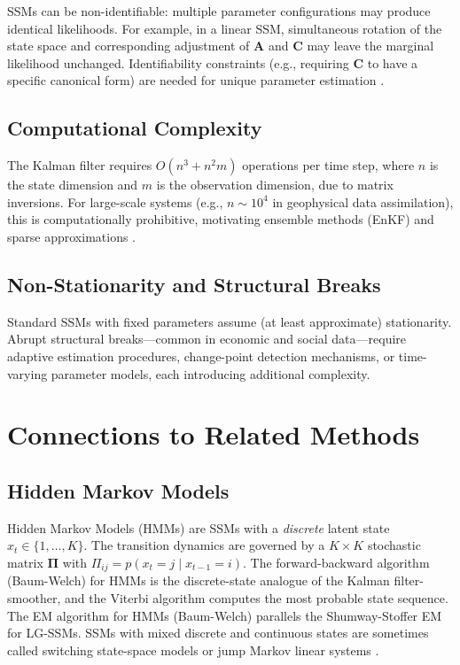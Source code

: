 \documentclass[conference]{IEEEtran}
\begin{document}
SSMs can be non-identifiable: multiple parameter configurations may produce identical likelihoods. For example, in a linear SSM, simultaneous rotation of the state space and corresponding adjustment of $\mathbf{A}$ and $\mathbf{C}$ may leave the marginal likelihood unchanged. Identifiability constraints (e.g., requiring $\mathbf{C}$ to have a specific canonical form) are needed for unique parameter estimation \cite{anderson1979optimal}.

\subsection{Computational Complexity}

The Kalman filter requires $O(n^3 + n^2 m)$ operations per time step, where $n$ is the state dimension and $m$ is the observation dimension, due to matrix inversions. For large-scale systems (e.g., $n \sim 10^4$ in geophysical data assimilation), this is computationally prohibitive, motivating ensemble methods (EnKF) and sparse approximations \cite{evensen2009data}.

\subsection{Non-Stationarity and Structural Breaks}

Standard SSMs with fixed parameters assume (at least approximate) stationarity. Abrupt structural breaks---common in economic and social data---require adaptive estimation procedures, change-point detection mechanisms, or time-varying parameter models, each introducing additional complexity.

\section{Connections to Related Methods}
\label{sec:connections}

\subsection{Hidden Markov Models}

Hidden Markov Models (HMMs) are SSMs with a \emph{discrete} latent state $x_t \in \{1, \ldots, K\}$. The transition dynamics are governed by a $K \times K$ stochastic matrix $\mathbf{\Pi}$ with $\Pi_{ij} = p(x_t = j \mid x_{t-1} = i)$. The forward-backward algorithm (Baum-Welch) \cite{baum1970maximization} for HMMs is the discrete-state analogue of the Kalman filter-smoother, and the Viterbi algorithm computes the most probable state sequence. The EM algorithm for HMMs (Baum-Welch) parallels the Shumway-Stoffer EM for LG-SSMs. SSMs with mixed discrete and continuous states are sometimes called switching state-space models or jump Markov linear systems \cite{murphy1998switching}.
\end{document}

